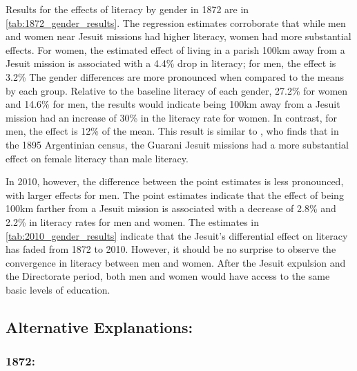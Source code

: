 \documentclass{article}
\begin{document}
Results for the effects of literacy by gender in 1872 are in \autoref{tab:1872_gender_results}. 
The regression estimates corroborate that while men and women near Jesuit missions had higher literacy, women had more substantial effects. 
For women, the estimated effect of living in a parish 100km away from a Jesuit mission is associated with a 4.4\% drop in literacy; for men, the effect is 3.2\%
The gender differences are more pronounced when compared to the means by each group.
Relative to the baseline literacy of each gender, 27.2\% for women and 14.6\% for men, the results would indicate being 100km away from a Jesuit mission had an increase of 30\% in the literacy rate for women. In contrast, for men, the effect is 12\% of the mean.
This result is similar to \textcite{Valencia_Caicedo2018-gp}, who finds that in the 1895 Argentinian census, the Guarani Jesuit missions had a more substantial effect on female literacy than male literacy. 

In 2010, however, the difference between the point estimates is less pronounced, with larger effects for men. The point estimates indicate that the effect of being 100km farther from a Jesuit mission is associated with a decrease of 2.8\% and 2.2\% in literacy rates for men and women. The estimates in \autoref{tab:2010_gender_results} indicate that the Jesuit's differential effect on literacy has faded from 1872 to 2010. However, it should be no surprise to observe the convergence in literacy between men and women. After the Jesuit expulsion and the Directorate period, both men and women would have access to the same basic levels of education. 

\subsection{Alternative Explanations:}
\subsubsection{1872:}
\end{document}
